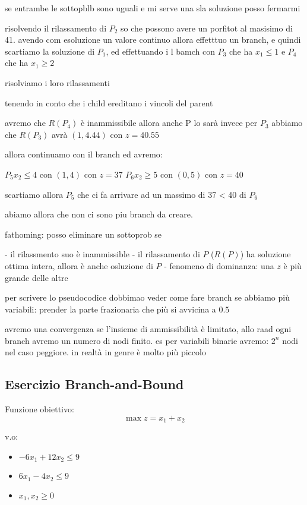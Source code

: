 se entrambe le sottopblb sono uguali e mi serve una sla soluzione posso fermarmi









risolvendo il rilassamento di $P_2$ so che possono avere un porfitot al masisimo di 41. avendo com esoluzione un valore continuo allora effetttuo un branch, e quindi scartiamo la soluzione di $P_1$, ed effettuando i l bamch con $P_3$ che ha  $x_1 \leq 1$ e $P_4$ che ha $x_1 \geq 2$

risolviamo i loro rilassamenti 

tenendo in conto che i child ereditano i vincoli del parent


avremo che $R(P_4)$ è inammissibile allora anche P lo sarà
invece per $P_3$ abbiamo che $R(P_3)$ avrà $(1, 4.44)$ con $z = 40.55$

allora continuamo con il branch ed avremo:

$P_5 x_2 \leq 4$ con $(1, 4)$ con $z = 37$
$P_6 x_2 \geq 5$ con $(0, 5)$ con $z = 40$

scartiamo allora $P_5$ che ci fa arrivare ad un massimo di 37 < 40 di $P_6$

abiamo allora che non ci sono piu branch da creare.

fathoming: posso eliminare un sottoprob se

- il rilassmento suo è inammissible
- il rilassamento di $P$ ($R(P)$) ha soluzione ottima intera, allora è anche osluzione di $P$
- fenomeno di dominanza: una $z$ è più grande delle altre


per scrivere lo pseudocodice dobbimao veder come fare branch se abbiamo più variabili: prender la parte frazionaria che più si avvicina a $0.5$


avremo una convergenza se l'insieme di ammissibilità è limitato, allo raad ogni branch avremo un numero di nodi finito. es per variabili binarie avremo: $2^n$ nodi nel caso peggiore. in realtà in genre è molto più piccolo


\subsection{Esercizio Branch-and-Bound}

Funzione obiettivo:
$$\max z = x_1 + x_2$$

v.o:

\begin{itemize}
    \item $-6x_1 + 12x_2 \leq 9$
    \item $6x_1 - 4x_2 \leq 9$
    \item $x_1, x_2 \geq 0$
\end{itemize}

